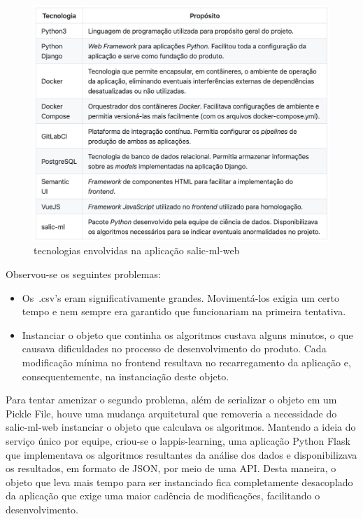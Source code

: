 \begin{figure}
\centering
\includegraphics{figs/salicml3.png}
\caption{tecnologias envolvidas na aplicação salic-ml-web}
\end{figure}

Observou-se os seguintes problemas:

\begin{itemize}
\tightlist
\item
  Os~.csv's eram significativamente grandes. Movimentá-los exigia um
  certo tempo e nem sempre era garantido que funcionariam na primeira
  tentativa.
\item
  Instanciar o objeto que continha os algoritmos custava alguns minutos,
  o que causava dificuldades no processo de desenvolvimento do produto.
  Cada modificação mínima no frontend resultava no recarregamento da
  aplicação e, consequentemente, na instanciação deste objeto.
\end{itemize}

Para tentar amenizar o segundo problema, além de serializar o objeto em
um Pickle File, houve uma mudança arquitetural que removeria a
necessidade do salic-ml-web instanciar o objeto que calculava os
algoritmos. Mantendo a ideia do serviço único por equipe, criou-se o
lappis-learning, uma aplicação Python Flask que implementava os
algoritmos resultantes da análise dos dados e disponibilizava os
resultados, em formato de JSON, por meio de uma API. Desta maneira, o
objeto que leva mais tempo para ser instanciado fica completamente
desacoplado da aplicação que exige uma maior cadência de modificações,
facilitando o desenvolvimento.

